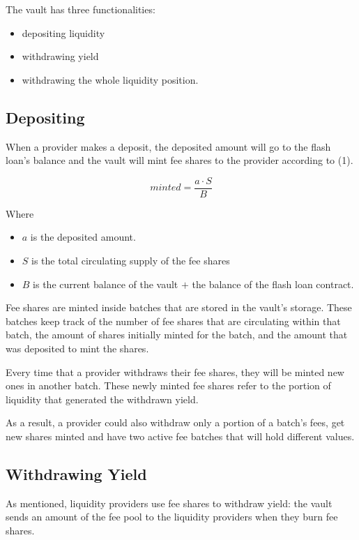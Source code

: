 \documentclass[twocolumn]{article}
\begin{document}
The vault has three functionalities:
\begin{itemize}
\item depositing liquidity
\item withdrawing yield
\item withdrawing the whole liquidity position.
\end{itemize} 

\subsection{Depositing}
When a provider makes a deposit, the deposited amount will go to the flash loan's balance and the vault will mint fee shares to the provider according to (1).

\begin{equation}
minted = \frac{a \cdot S}{B}
\end{equation}

Where
\begin{itemize}
\item \(a\) is the deposited amount.
\item \(S\) is the total circulating supply of the fee shares
\item \(B\) is the current balance of the vault \( + \) the balance of the flash loan contract.
\end{itemize}

Fee shares are minted inside batches that are stored in the vault's storage. These batches keep track of the number of fee shares that are circulating within that batch, the amount of shares initially minted for the batch, and the amount that was deposited to mint the shares. 

Every time that a provider withdraws their fee shares, they will be minted new ones in another batch. These newly minted fee shares refer to the portion of liquidity that generated the withdrawn yield. 

As a result, a provider could also withdraw only a portion of a batch's fees, get new shares minted and have two active fee batches that will hold different values.

\subsection{Withdrawing Yield}

As mentioned, liquidity providers use fee shares to withdraw yield: the vault sends an amount of the fee pool to the liquidity providers when they burn fee shares.
\end{document}
